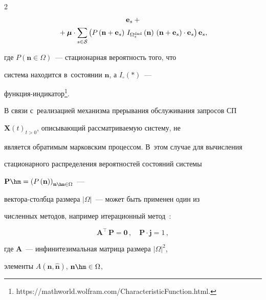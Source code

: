 \begin{multicols}{2}
\begin{multline*}
\mathbf{e}_s +{}\hspace*{-2.69116pt}\\


{}+ \boldsymbol\mu \cdot 


\sum_{s\in\mathcal{S}}{\left(P\left(\mathbf{n}+\mathbf{e}_s\right)\, 


I_{\Omega_s^{\mathrm{dad}}}\left(\mathbf{n}\right)\, 


\left(\mathbf{n}+\mathbf{e}_s\right)\cdot\mathbf{e}_s\right)\mathbf{e}_s},


\end{multline*}


где $P\left(\mathbf{n}\in\Omega\right)$~--- стационарная вероятность того, что 


система находится в~состоянии $\mathbf{n}$, а $I_{\circ}\left(\ast\right)$~--- 


функ\-ция-ин\-ди\-ка\-тор\footnote{{\sf https://mathworld.wolfram.com/CharacteristicFunction.html.}}.





В связи с~реализацией механизма прерывания обслуживания запросов СП 


$\mathbf{X}\left(t\right)_{t>0}$, опи\-сы\-ва\-ющий рас\-смат\-ри\-ва\-емую сис\-те\-му, не 


является обратимым марковским процессом. В~этом случае для вы\-чис\-ле\-ния 


стационарного распределения вероятностей со\-сто\-яний сис\-те\-мы 


$\mathbf{P}\hm=\left(P\left(\mathbf{n}\right)\right)_{\mathbf{n}\hm\in\Omega}$~--- 


век\-то\-ра-столб\-ца размера $\lvert\Omega\rvert$~--- может быть применен один из 


численных методов, например итерационный метод~\cite{Zhou2022,Stepanov}:


\begin{equation*}




\mathbf{A}^\top\, \mathbf{P} = \mathbf{0}\,,\quad \mathbf{P}\cdot \mathbf{j} = 1\,,


\end{equation*}


где $\mathbf{A}$~--- инфинитезимальная матрица размера $\lvert\Omega\rvert^2$, 


элементы $A\left(\mathbf{n},\hat{\mathbf{n}}\right)$, $\mathbf{n}\hm\in\Omega$, 



\end{multicols}
